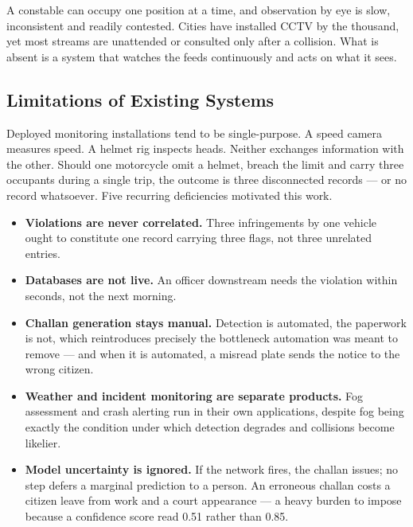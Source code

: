 \documentclass[10pt,a4paper,twocolumn]{article}
\begin{document}
A constable can occupy one position at a time, and observation by eye is slow, inconsistent and readily contested.
Cities have installed CCTV by the thousand, yet most streams are unattended or consulted only after a collision. What
is absent is a system that watches the feeds continuously and acts on what it sees.

\subsection{Limitations of Existing Systems}
Deployed monitoring installations tend to be single-purpose. A speed camera measures speed. A helmet rig inspects
heads. Neither exchanges information with the other. Should one motorcycle omit a helmet, breach the limit and carry
three occupants during a single trip, the outcome is three disconnected records --- or no record whatsoever. Five
recurring deficiencies motivated this work.
\begin{itemize}
\item \textbf{Violations are never correlated.} Three infringements by one vehicle ought to constitute one record
carrying three flags, not three unrelated entries.
\item \textbf{Databases are not live.} An officer downstream needs the violation within seconds, not the next morning.
\item \textbf{Challan generation stays manual.} Detection is automated, the paperwork is not, which reintroduces
precisely the bottleneck automation was meant to remove --- and when it is automated, a misread plate sends the notice
to the wrong citizen.
\item \textbf{Weather and incident monitoring are separate products.} Fog assessment and crash alerting run in their
own applications, despite fog being exactly the condition under which detection degrades and collisions become likelier.
\item \textbf{Model uncertainty is ignored.} If the network fires, the challan issues; no step defers a marginal
prediction to a person. An erroneous challan costs a citizen leave from work and a court appearance --- a heavy burden
to impose because a confidence score read 0.51 rather than 0.85.
\end{itemize}
\end{document}
